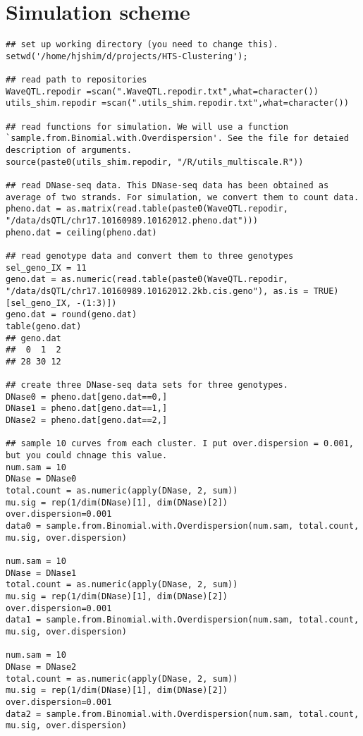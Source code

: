 \documentclass[11pt]{article}
\begin{document}
\section{Simulation scheme}
\label{sec-2}
\begin{lstlisting}
## set up working directory (you need to change this).
setwd('/home/hjshim/d/projects/HTS-Clustering');

## read path to repositories 
WaveQTL.repodir =scan(".WaveQTL.repodir.txt",what=character())
utils_shim.repodir =scan(".utils_shim.repodir.txt",what=character())

## read functions for simulation. We will use a function `sample.from.Binomial.with.Overdispersion'. See the file for detaied description of arguments.
source(paste0(utils_shim.repodir, "/R/utils_multiscale.R"))

## read DNase-seq data. This DNase-seq data has been obtained as average of two strands. For simulation, we convert them to count data. 
pheno.dat = as.matrix(read.table(paste0(WaveQTL.repodir, "/data/dsQTL/chr17.10160989.10162012.pheno.dat")))
pheno.dat = ceiling(pheno.dat)

## read genotype data and convert them to three genotypes
sel_geno_IX = 11
geno.dat = as.numeric(read.table(paste0(WaveQTL.repodir, "/data/dsQTL/chr17.10160989.10162012.2kb.cis.geno"), as.is = TRUE)[sel_geno_IX, -(1:3)])
geno.dat = round(geno.dat)
table(geno.dat)
## geno.dat
##  0  1  2 
## 28 30 12 

## create three DNase-seq data sets for three genotypes.
DNase0 = pheno.dat[geno.dat==0,]
DNase1 = pheno.dat[geno.dat==1,]
DNase2 = pheno.dat[geno.dat==2,]

## sample 10 curves from each cluster. I put over.dispersion = 0.001, but you could chnage this value. 
num.sam = 10
DNase = DNase0
total.count = as.numeric(apply(DNase, 2, sum))
mu.sig = rep(1/dim(DNase)[1], dim(DNase)[2])
over.dispersion=0.001
data0 = sample.from.Binomial.with.Overdispersion(num.sam, total.count, mu.sig, over.dispersion)

num.sam = 10
DNase = DNase1
total.count = as.numeric(apply(DNase, 2, sum))
mu.sig = rep(1/dim(DNase)[1], dim(DNase)[2])
over.dispersion=0.001
data1 = sample.from.Binomial.with.Overdispersion(num.sam, total.count, mu.sig, over.dispersion)

num.sam = 10
DNase = DNase2
total.count = as.numeric(apply(DNase, 2, sum))
mu.sig = rep(1/dim(DNase)[1], dim(DNase)[2])
over.dispersion=0.001
data2 = sample.from.Binomial.with.Overdispersion(num.sam, total.count, mu.sig, over.dispersion)
\end{lstlisting}
\end{document}
